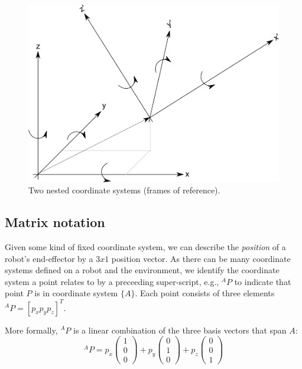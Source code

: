 \begin{figure}
	\centering
		\includegraphics[width=\textwidth]{figs/frameofreference.png}
	\caption{Two nested coordinate systems (frames of reference).}
	\label{fig:nestedcoords}
\end{figure}

\subsection{Matrix notation}
Given some kind of fixed coordinate system, we can describe the \emph{position} of a robot's end-effector by a $3x1$ position vector. As there can be many coordinate systems defined on a robot and the environment, we identify the coordinate system a point relates to by a preceeding super-script, e.g., $ ^AP$ to indicate that point $P$ is in coordinate system $\{A\}$. Each point consists of three elements $ ^AP=[p_x p_y p_z]^T$.

More formally, $^AP$ is a linear combination of the three basis vectors that span $A$:
\begin{equation}
^AP=p_x\left(\begin{array}{c}1\\0\\0\end{array}\right)+p_y\left(\begin{array}{c}0\\1\\0\end{array}\right)+p_z\left(\begin{array}{c}0\\0\\1\end{array}\right)\label{eq:basis}
\end{equation}

